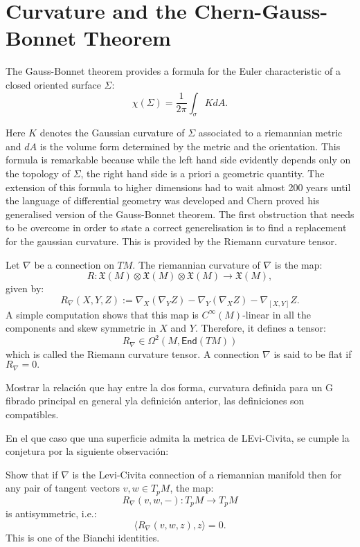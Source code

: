 \section{Curvature and the Chern-Gauss-Bonnet Theorem}

The Gauss-Bonnet theorem provides a formula for the Euler characteristic of a closed oriented surface $\Sigma$:
\[ \chi(\Sigma)= \frac{1}{2\pi} \int_\sigma K dA.\]

Here $K$ denotes the Gaussian curvature of $\Sigma$ associated to a riemannian metric and $dA$ is the volume form determined by the metric and the orientation. This formula is remarkable because while the left hand side evidently depends only on the topology of $\Sigma$, the right hand side is a priori a geometric quantity. The extension of this formula to higher dimensions had to wait almost 200 years until the language of differential geometry was developed and Chern \cite{Chern} proved his generalised version of the Gauss-Bonnet theorem. The first obstruction that needs to be overcome in order to state a correct generelisation is to find a replacement for the gaussian curvature. This is provided by the Riemann curvature tensor.

\begin{definition}
	Let $\nabla$ be a connection on $TM$. The riemannian curvature of $\nabla$ is the map:
	\[ R: \mathfrak{X}(M) \otimes \mathfrak{X}(M) \otimes \mathfrak{X}(M) \rightarrow \mathfrak{X}(M),\]
	given by:
	\[ R_\nabla (X,Y,Z):= \nabla_X (\nabla_Y Z)- \nabla_Y (\nabla_X Z)- \nabla_{[X,Y]}Z.\]
	A simple computation shows that this map is $C^\infty(M)$-linear in all the components and skew symmetric in $X$ and $Y$. Therefore, it defines a tensor:
	\[ R_\nabla \in \Omega^2(M, \mathsf{End}(TM))\]
	which is called the Riemann curvature tensor. A connection $\nabla$ is said to be flat if $R_\nabla=0.$
\end{definition}
 Mostrar la relación que hay entre la dos forma, curvatura definida para un G fibrado principal en general yla definición anterior, las definiciones son compatibles. 
 
 En el que caso que una superficie admita la metrica de LEvi-Civita, se cumple la conjetura por la siguiente observación:
\begin{exercise}
	Show that if $\nabla$ is the Levi-Civita connection of a riemannian manifold then for any pair of tangent vectors
	$v,w \in T_pM$, the map:
	\[ R_\nabla(v,w,-): T_pM \rightarrow T_pM\]
	is antisymmetric, i.e.:
	\[  \langle R_\nabla(v,w,z), z \rangle =0.\]
	This is one of the Bianchi identities.
\end{exercise}

